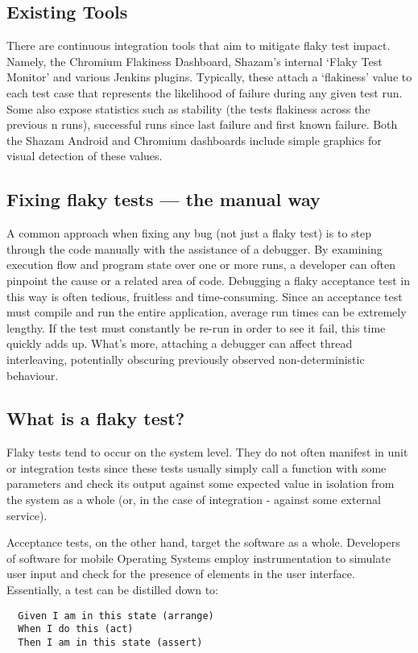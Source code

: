 \subsection{Existing Tools}

There are continuous integration tools that aim to mitigate flaky test impact. Namely, the Chromium Flakiness Dashboard, Shazam’s internal ‘Flaky Test Monitor’ and various Jenkins plugins. Typically, these attach a ‘flakiness’ value to each test case that represents the likelihood of failure during any given test run. Some also expose statistics such as stability (the tests flakiness across the previous n runs), successful runs since last failure and first known failure. Both the Shazam Android and Chromium dashboards include simple graphics for visual detection of these values.

\subsection{Fixing flaky tests --- the manual way}

A common approach when fixing any bug (not just a flaky test) is to step through the code manually with the assistance of a debugger. By examining execution flow and program state over one or more runs, a developer can often pinpoint the cause or a related area of code. Debugging a flaky acceptance test in this way is often tedious, fruitless and time-consuming. Since an acceptance test must compile and run the entire application, average run times can be extremely lengthy. If the test must constantly be re-run in order to see it fail, this time quickly adds up. What's more, attaching a debugger can affect thread interleaving, potentially obscuring previously observed non-deterministic behaviour.

\subsection{What is a flaky test?}
Flaky tests tend to occur on the system level. They do not often manifest in unit or integration tests since these tests usually simply call a function with some parameters and check its output against some expected value in isolation from the system as a whole (or, in the case of integration - against some external service).

Acceptance tests, on the other hand, target the software as a whole. Developers of software for mobile Operating Systems employ instrumentation to simulate user input and check for the presence of elements in the user interface. Essentially, a test can be distilled down to:
\begin{verbatim}
  Given I am in this state (arrange)
  When I do this (act)
  Then I am in this state (assert)
\end{verbatim}

